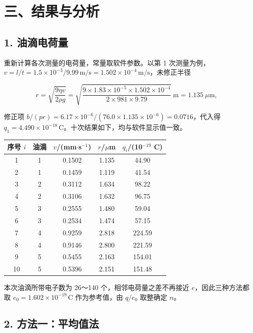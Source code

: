 \clearpage
\section*{三、结果与分析}

\subsection*{1. 油滴电荷量}

重新计算各次测量的电荷量，常量取软件参数。以第 1 次测量为例，$v=l/t=1.5\times10^{-3}/9.99\,\mathrm{m/s}=1.502\times10^{-4}\,\mathrm{m/s}$，未修正半径

\[
r=\sqrt{\frac{9\eta v}{2\rho g}}=\sqrt{\frac{9\times1.83\times10^{-5}\times1.502\times10^{-4}}{2\times981\times9.79}}\ \mathrm{m}=1.135\ \mu\mathrm{m},
\]

修正项 $b/(pr)=6.17\times10^{-6}/(76.0\times1.135\times10^{-6})=0.0716$，代入得 $q_1=4.490\times10^{-18}\,\mathrm{C}$。十次结果如下，均与软件显示值一致。

\begin{center}\small\setlength{\tabcolsep}{4pt}
\begin{tabular}{ccccc}
\toprule
序号 $i$ & 油滴 & $v$/(mm$\cdot$s$^{-1}$) & $r$/$\mu$m & $q_i$/(10$^{-19}$ C) \\
\midrule
1 & 1 & 0.1502 & 1.135 & 44.90 \\
2 & 1 & 0.1459 & 1.119 & 41.54 \\
3 & 2 & 0.3112 & 1.634 & 98.22 \\
4 & 2 & 0.3106 & 1.632 & 96.75 \\
5 & 3 & 0.2555 & 1.480 & 59.04 \\
6 & 3 & 0.2534 & 1.474 & 57.15 \\
7 & 4 & 0.9259 & 2.818 & 224.59 \\
8 & 4 & 0.9146 & 2.800 & 221.59 \\
9 & 5 & 0.5455 & 2.163 & 154.01 \\
10 & 5 & 0.5396 & 2.151 & 151.48 \\
\bottomrule\end{tabular}\end{center}

本次油滴所带电子数为 26～140 个，相邻电荷量之差不再接近 $e$，因此三种方法都取 $e_0=1.602\times10^{-19}\,\mathrm{C}$ 作为参考值，由 $q/e_0$ 取整确定 $n$。

\subsection*{2. 方法一：平均值法}


